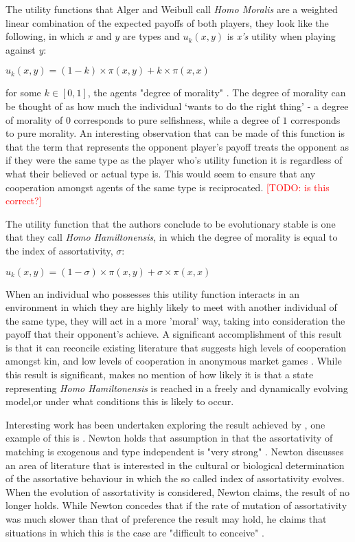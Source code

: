 \documentclass[11pt]{article}
\newcommand{\todo}[1]{\textcolor{red}{[TODO: #1]}\PackageWarning{TODO:}{#1!}}
\newcommand*{\np}{\par\noindent\newline}
\begin{document}
\np The utility functions that Alger and Weibull call \textit{Homo Moralis} are a weighted linear combination of the
expected payoffs of both players, they look like the following, in which $x$ and $y$ are types and $u_k(x, y)$ is
\textit{x's} utility when playing against \textit{y}:
\begin{center}
	$u_k(x, y) = (1 - k) \times \pi(x, y) + k \times \pi(x, x)$
\end{center}
for some $k \in [0, 1]$, the agents "degree of morality" \citep[~p 2274.]{alger_homo_2013}. The degree of morality can
be thought of as how much the individual `wants to do the right thing' - a degree of morality of $0$ corresponds to pure
selfishness, while a degree of $1$ corresponds to pure morality. An interesting observation that can be made of this
function is that the term that represents the opponent player's payoff treats the opponent as if they were the same type
as the player who's utility function it is regardless of what their believed or actual type is. This would seem to
ensure that any cooperation amongst agents of the same type is reciprocated. \todo{is this correct?}

\np The  utility function that the authors conclude to be evolutionary stable is one that they call \textit{Homo
Hamiltonensis}, in which the degree of morality is equal to the index of assortativity, $\sigma$:
\begin{center}
	$u_k(x, y) = (1 - \sigma) \times \pi(x, y) + \sigma \times \pi(x, x)$
\end{center}
When an individual who possesses this utility function interacts in an environment in which they are highly likely
to meet with another individual of the same type, they will act in a more 'moral' way, taking into consideration the
payoff that their opponent's achieve. A significant accomplishment of this result is that it can reconcile existing
literature that suggests high levels of cooperation amongst kin, and low levels of cooperation in anonymous market games \citep[See ~p. 2296][]{alger_homo_2013}. While this result is significant, \citep{alger_homo_2013} makes no
mention of how likely it is that a state representing \textit{Homo Hamiltonensis} is reached in a freely and dynamically evolving model,or under what conditions this is likely to occur.

\np Interesting work has been undertaken exploring the result achieved by \citet{alger_homo_2013}, one example of this
is \citet{newton_preferences_2017}. Newton holds that assumption in \citet{alger_homo_2013} that the assortativity of
matching is exogenous and type independent is "very strong" \citep{newton_preferences_2017}. Newton discusses an area of
literature that is interested in the cultural or biological determination of the assortative behaviour in which the so
called index of assortativity evolves. When the evolution of assortativity is considered, Newton claims, the result of
\citet{alger_homo_2013} no longer holds. While Newton concedes that if the rate of mutation of assortativity was much
slower than that of preference the result may hold, he claims that situations in which this is the case are
"difficult to conceive" \citep{newton_preferences_2017}.
\end{document}
